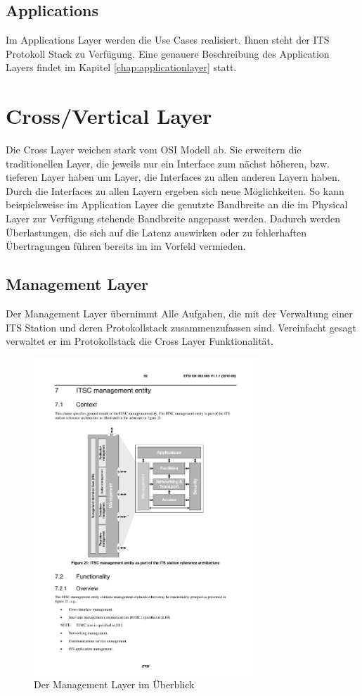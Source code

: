 \subsection{Applications}
Im Applications Layer werden die Use Cases realisiert. Ihnen steht der \ac{ITS} Protokoll Stack zu Verfügung. Eine genauere Beschreibung des Application Layers findet im Kapitel \ref{chap:applicationlayer} statt.

\section{Cross/Vertical Layer}
Die Cross Layer weichen stark vom \ac{OSI} Modell ab. Sie erweitern die traditionellen Layer, die jeweils nur ein Interface zum nächst höheren, bzw. tieferen Layer haben um Layer, die Interfaces zu allen anderen Layern haben. Durch die Interfaces zu allen Layern ergeben sich neue Möglichkeiten. So kann beispielsweise im Application Layer die genutzte Bandbreite an die im Physical Layer zur Verfügung stehende Bandbreite angepasst werden. Dadurch werden Überlastungen, die sich auf die Latenz auswirken oder zu fehlerhaften Übertragungen führen bereits im im Vorfeld vermieden.

\subsection{Management Layer \label{architektur_managementLayer}}
Der Management Layer übernimmt Alle Aufgaben, die mit der Verwaltung einer \ac{ITS} Station und deren Protokollstack zusammenzufassen sind. Vereinfacht gesagt verwaltet er im Protokollstack die Cross Layer Funktionalität. 


\begin{figure}
	\includegraphics[width=0.75\textwidth]{content/images/02_architektur/managementLayer.pdf}
	\caption{Der Management Layer im Überblick \cite{etsi2010302}}
	\label{fig:architektur_managementLayer}
\end{figure}

